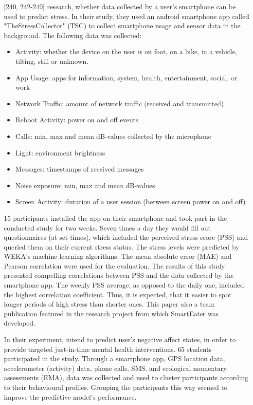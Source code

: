 \textcite{SmartphoneBasedStressPrediction2015}[240, 242-249] research, whether data collected by a user's smartphone can be used to predict stress. In their study, they used an android smartphone app called "TheStressCollector" (TSC) to collect smartphone usage and sensor data in the background. The following data was collected:
\begin{itemize}
  \item Activity: whether the device on the user is on foot, on a bike, in a vehicle, tilting, still or unknown.
  \item App Usage: apps for information, system, health, entertainment, social, or work
  \item Network Traffic: amount of network traffic (received and transmitted)
  \item Reboot Activity: power on and off events
  \item Calls: min, max and mean dB-values collected by the microphone
  \item Light: environment brightness
  \item Messages: timestamps of received messages
  \item Noise exposure: min, max and mean dB-values
  \item Screen Activity: duration of a user session (between screen power on and off)
\end{itemize}

15 participants installed the app on their smartphone and took part in the conducted study for two weeks. Seven times a day they would fill out questionnaires (at set times), which included the perceived stress score (PSS) and queried them on their current stress status. The stress levels were predicted by WEKA's machine learning algorithms. The mean absolute error (MAE) and Pearson correlation were used for the evaluation. The results of this study presented compelling correlations between PSS and the data collected by the smartphone app. The weekly PSS average, as opposed to the daily one, included the highest correlation coefficient. Thus, it is expected, that it easier to spot longer periods of high stress than shorter ones. 
This paper also a team publication featured in the research project from which SmartEater was developed.

In their experiment, \textcite{ClusterPassivelySensedData2018} intend to predict user's negative affect states, in order to provide targeted just-in-time mental health interventions. 65 students participated in the study. Through a smartphone app, GPS location data, accelerometer (activity) data, phone calls, SMS, and ecological momentary assessments (EMA), data was collected and used to cluster participants according to their behavioural profiles. Grouping the participants this way seemed to improve the predictive model's performance.



